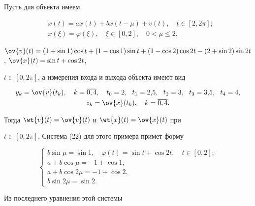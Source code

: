 \begin{exam}


Пусть для объекта имеем


\begin{equation}


\begin{split}  %


&\Dot{x}(t)= ax(t) + bx(t-\mu) + v(t), \quad t\in[2,2\pi];\\


&x(\xi)= \varphi(\xi), \quad \xi\in[0,2], \quad 0<\mu\leq 2,


\end{split}


\end{equation}


$\ov{v}(t)=(1+\sin 1)\cos t + (1-\cos 1)\sin t + (1-\cos 2)\cos


2t - (2+\sin 2)\sin 2t$, $\ov{x}(t) = \sin t+ \cos 2t$,


$t\in[0,2\pi]$, а измерения входа и выхода объекта имеют вид


\begin{gather}


y_k=\ov{v}(t_k), \quad k=\overline{0,4}, \quad


t_0=2,\ \ t_1=2{,}5,\ \ t_2=3,\ \ t_3=3{,}5,\ \ t_4=4, \\


%


z_k=\ov{x}(t_k), \quad k=\overline{0,4}.


\end{gather}


Тогда $\wt{v}(t)=\ov{v}(t)$ и $\wt{x}(t)=\ov{x}(t)$ при


$t\in[0,2\pi]$. Система (22) для  этого примера примет форму


$$


\begin{cases}


b\sin\mu = \sin 1, \quad \varphi(t)=\sin t+\cos 2t, \quad t\in[0,2];\\


a+b\cos\mu = -1 + \cos 1, \\


a+b\cos 2\mu = -1 + \cos 2, \\


b\sin 2\mu = \sin 2.


\end{cases}


$$


Из последнего уравнения этой системы 



\end{exam}
